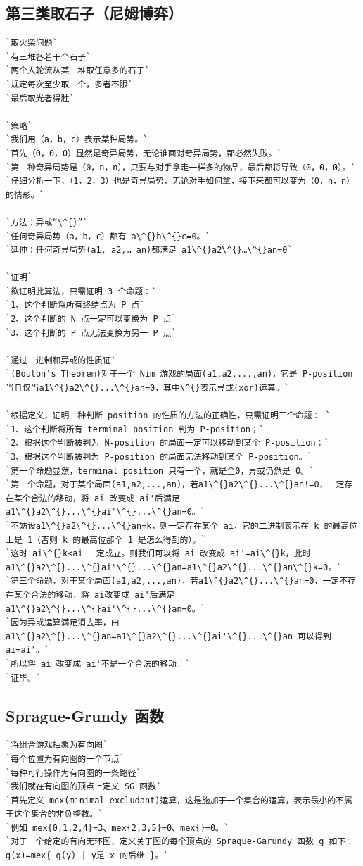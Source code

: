 \documentclass[a4paper]{article}
\begin{document}
\begin{CJK*}{UTF8}{gbsn}
\begin{multicols}{3}
\begin{flushleft}
\subsection{第三类取石子（尼姆博弈）}
\begin{lstlisting}
`取火柴问题`
`有三堆各若干个石子`
`两个人轮流从某一堆取任意多的石子`
`规定每次至少取一个，多者不限`
`最后取光者得胜`

`策略`
`我们用（a，b，c）表示某种局势。`
`首先（0，0，0）显然是奇异局势，无论谁面对奇异局势，都必然失败。`
`第二种奇异局势是（0，n，n），只要与对手拿走一样多的物品，最后都将导致（0，0，0）。`
`仔细分析一下，（1，2，3）也是奇异局势，无论对手如何拿，接下来都可以变为（0，n，n）的情形。`

`方法：异或“\^{}”`
`任何奇异局势（a，b，c）都有 a\^{}b\^{}c=0。`
`延伸：任何奇异局势(a1, a2,… an)都满足 a1\^{}a2\^{}…\^{}an=0`

`证明`
`欲证明此算法，只需证明 3 个命题：`
`1、这个判断将所有终结点为 P 点`
`2、这个判断的 N 点一定可以变换为 P 点`
`3、这个判断的 P 点无法变换为另一 P 点`

`通过二进制和异或的性质证`
`(Bouton's Theorem)对于一个 Nim 游戏的局面(a1,a2,...,an)，它是 P-position 当且仅当a1\^{}a2\^{}...\^{}an=0，其中\^{}表示异或(xor)运算。`

`根据定义，证明一种判断 position 的性质的方法的正确性，只需证明三个命题： `
`1、这个判断将所有 terminal position 判为 P-position；`
`2、根据这个判断被判为 N-position 的局面一定可以移动到某个 P-position；`
`3、根据这个判断被判为 P-position 的局面无法移动到某个 P-position。`
`第一个命题显然，terminal position 只有一个，就是全0，异或仍然是 0。`
`第二个命题，对于某个局面(a1,a2,...,an)，若a1\^{}a2\^{}...\^{}an!=0，一定存在某个合法的移动，将 ai 改变成 ai'后满足 a1\^{}a2\^{}...\^{}ai'\^{}...\^{}an=0。`
`不妨设a1\^{}a2\^{}...\^{}an=k，则一定存在某个 ai，它的二进制表示在 k 的最高位上是 1（否则 k 的最高位那个 1 是怎么得到的）。`
`这时 ai\^{}k<ai 一定成立。则我们可以将 ai 改变成 ai'=ai\^{}k，此时 a1\^{}a2\^{}...\^{}ai'\^{}...\^{}an=a1\^{}a2\^{}...\^{}an\^{}k=0。`
`第三个命题，对于某个局面(a1,a2,...,an)，若a1\^{}a2\^{}...\^{}an=0，一定不存在某个合法的移动，将 ai改变成 ai'后满足 a1\^{}a2\^{}...\^{}ai'\^{}...\^{}an=0。`
`因为异或运算满足消去率，由 a1\^{}a2\^{}...\^{}an=a1\^{}a2\^{}...\^{}ai'\^{}...\^{}an 可以得到 ai=ai'。`
`所以将 ai 改变成 ai'不是一个合法的移动。`
`证毕。`

\end{lstlisting}

\subsection{Sprague-Grundy 函数}
\begin{lstlisting}
`将组合游戏抽象为有向图`
`每个位置为有向图的一个节点`
`每种可行操作为有向图的一条路径`
`我们就在有向图的顶点上定义 SG 函数`
`首先定义 mex(minimal excludant)运算，这是施加于一个集合的运算，表示最小的不属于这个集合的非负整数。`
`例如 mex{0,1,2,4}=3、mex{2,3,5}=0、mex{}=0。`
`对于一个给定的有向无环图，定义关于图的每个顶点的 Sprague-Garundy 函数 g 如下：g(x)=mex{ g(y) | y是 x 的后继 }。`
\end{lstlisting}


\end{flushleft}
\end{multicols}
\end{CJK*}
\end{document}

